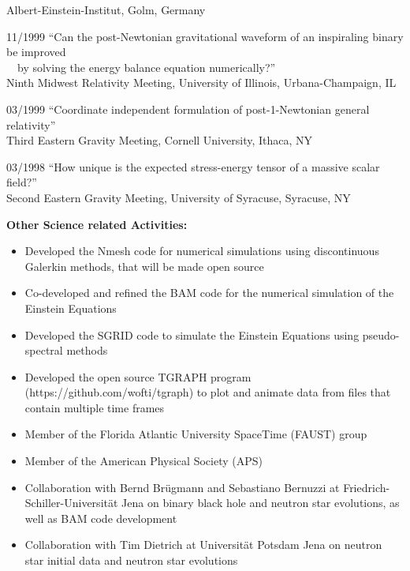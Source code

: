 \documentclass[11pt]{article}
\begin{document}
\begin{list}{}{\leftmargin=5em =1.5em \rightmargin=-8em =7em}
		{Albert-Einstein-Institut, Golm, Germany}
\item[11/1999] ``Can the post-Newtonian gravitational waveform of an
		inspiraling binary be improved\\
		\ \ by solving the energy balance equation numerically?''\\
		{Ninth Midwest Relativity Meeting},
		{University of Illinois, Urbana-Champaign, IL}
\item[03/1999] ``Coordinate independent formulation of post-1-Newtonian
                 general relativity''\\
		{Third Eastern Gravity Meeting},
		{Cornell University, Ithaca, NY}
\item[03/1998] ``How unique is the expected stress-energy tensor of a
		massive scalar field?''\\
		{Second Eastern Gravity Meeting},
		{University of Syracuse, Syracuse, NY}
\end{list}



\bigskip

{\bf Other Science related Activities:}

\begin{itemize}
\item	Developed the Nmesh code for numerical simulations using
	discontinuous Galerkin methods, that will be made open source
\item	Co-developed and refined the BAM code for the numerical 
	simulation of the Einstein Equations
\item	Developed the SGRID code to simulate the Einstein Equations using
	pseudo-spectral	methods
\item	Developed the open source TGRAPH program
	(https://github.com/wofti/tgraph) to plot and animate data from
	files that contain multiple time frames
\item	Member of the Florida Atlantic University SpaceTime (FAUST) group
\item	Member of the American Physical Society (APS)
\item	Collaboration with Bernd Br\"ugmann and Sebastiano Bernuzzi
	at Friedrich-Schiller-Universit\"at 
	Jena on binary black hole and neutron star evolutions,
	as well as BAM code development
\item	Collaboration with Tim Dietrich at Universit\"at Potsdam
	Jena on neutron star initial data and neutron star evolutions
\end{itemize}
\end{document}
